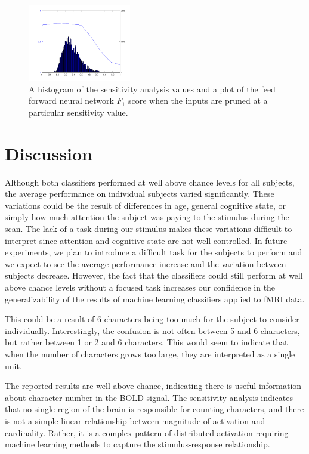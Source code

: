 \documentclass[preprint,5p,authoryear]{elsarticle}
\begin{document}
\begin{table}
\begin{figure}
\centering
\includegraphics[width=0.4\textwidth]{figures/sensitivity-cutoff}
\caption{A histogram of the sensitivity analysis values and a plot of the feed forward neural network $F_1$ score when the inputs are pruned at a particular sensitivity value. }
\label{fig:sensitivity-cutoff}
\end{figure}

\section{Discussion}
Although both classifiers performed at well above chance levels for all subjects, the average performance on individual subjects varied significantly.
These variations could be the result of differences in age, general cognitive state, or simply how much attention the subject was paying to the stimulus during the scan.
The lack of a task during our stimulus makes these variations difficult to interpret since attention and cognitive state are not well controlled.
In future experiments, we plan to introduce a difficult task for the subjects to perform and we expect to see the average performance increase and the variation between subjects decrease.
However, the fact that the classifiers could still perform at well above chance levels without a focused task increases our confidence in the generalizability of the results of machine learning classifiers applied to fMRI data.


This could be a result of 6 characters being too much for the subject to consider individually.
Interestingly, the confusion is not often between 5 and 6 characters, but rather between 1 or 2 and 6 characters.
This would seem to indicate that when the number of characters grows too large, they are interpreted as a single unit.

The reported results are well above chance, indicating there is useful information about character number in the BOLD signal.
The sensitivity analysis indicates that no single region of the brain is responsible for counting characters, and there is not a simple linear relationship between magnitude of activation and cardinality.
Rather, it is a complex pattern of distributed activation requiring machine learning methods to capture the stimulus-response relationship.


\end{table}
\end{document}
